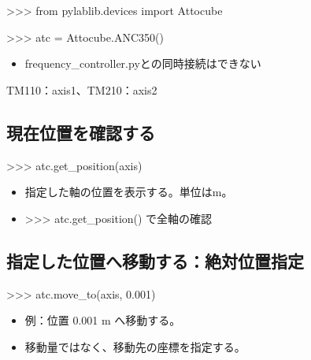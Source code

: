 \documentclass[a4paper,11pt]{ltjsarticle}
\begin{document}
\begin{command}

>>> from pylablib.devices import Attocube

>>> atc = Attocube.ANC350()

\end{command}

\begin{itemize}

\item frequency\_controller.pyとの同時接続はできない

\end{itemize}

TM110：axis1、TM210：axis2


\subsection{現在位置を確認する}

\begin{command}

>>> atc.get_position(axis)

\end{command}

\begin{itemize}

\item 指定した軸の位置を表示する。単位はm。

\item >>> atc.get\_position() で全軸の確認

\end{itemize}

\subsection{指定した位置へ移動する：絶対位置指定}

\begin{command}

>>> atc.move_to(axis, 0.001)

\end{command}

\begin{itemize}

\item 例：位置 0.001 m へ移動する。

\item 移動量ではなく、移動先の座標を指定する。

\end{itemize}
\end{document}
